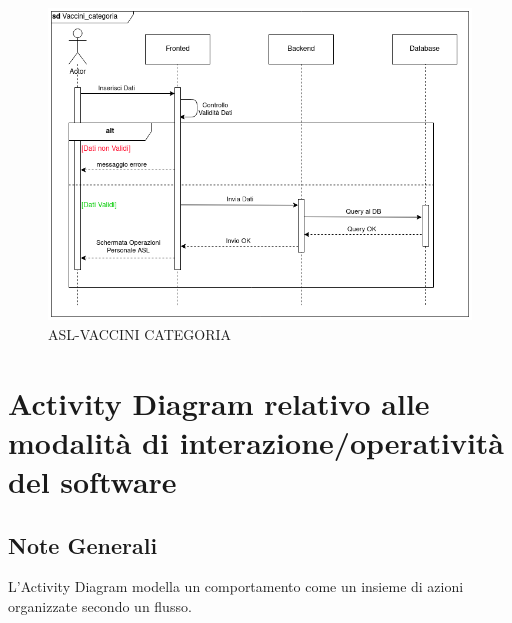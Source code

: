 \documentclass[a4paper,12pt,openany,oneside]{book}
\begin{document}
\begin{figure}[h] 
\centering
\includegraphics[width=0.8\columnwidth]{ASL-VACCINI CATEGORIA.png} 
\caption{ASL-VACCINI CATEGORIA} 
\end{figure}
\clearpage
\newpage
\section{Activity Diagram relativo alle modalità di interazione/operatività del
software}
\subsection*{Note Generali}
L’Activity Diagram modella un comportamento come un insieme di azioni organizzate secondo un
flusso.
\end{document}
